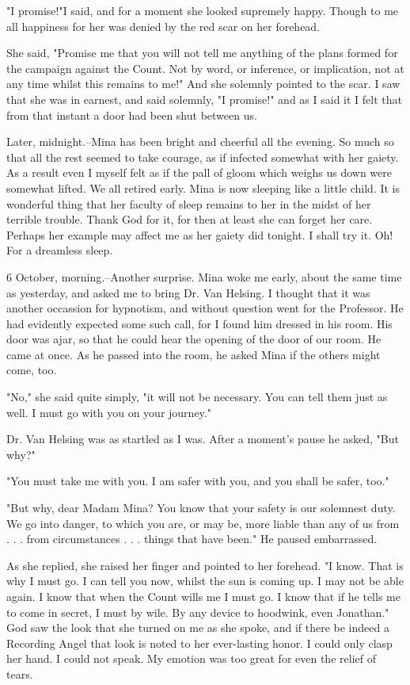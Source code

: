 "I promise!"I said, and for a moment she looked supremely happy. Though to me all happiness for her was denied by the red scar on her forehead. 

She said, "Promise me that you will not tell me anything of the plans formed for the campaign against the Count. Not by word, or inference, or implication, not at any time whilst this remains to me!" And she solemnly pointed to the scar. I saw that she was in earnest, and said solemnly, "I promise!" and as I said it I felt that from that instant a door had been shut between us. 

Later, midnight.--Mina has been bright and cheerful all the evening. So much so that all the rest seemed to take courage, as if infected somewhat with her gaiety. As a result even I myself felt as if the pall of gloom which weighs us down were somewhat lifted. We all retired early. Mina is now sleeping like a little child. It is wonderful thing that her faculty of sleep remains to her in the midst of her terrible trouble. Thank God for it, for then at least she can forget her care. Perhaps her example may affect me as her gaiety did tonight. I shall try it. Oh! For a dreamless sleep. 

6 October, morning.--Another surprise. Mina woke me early, about the same time as yesterday, and asked me to bring Dr. Van Helsing. I thought that it was another occassion for hypnotism, and without question went for the Professor. He had evidently expected some such call, for I found him dressed in his room. His door was ajar, so that he could hear the opening of the door of our room. He came at once. As he passed into the room, he asked Mina if the others might come, too. 

"No," she said quite simply, "it will not be necessary. You can tell them just as well. I must go with you on your journey." 

Dr. Van Helsing was as startled as I was. After a moment's pause he asked, "But why?" 

"You must take me with you. I am safer with you, and you shall be safer, too." 

"But why, dear Madam Mina? You know that your safety is our solemnest duty. We go into danger, to which you are, or may be, more liable than any of us from . . . from circumstances . . . things that have been." He paused embarrassed. 

As she replied, she raised her finger and pointed to her forehead. "I know. That is why I must go. I can tell you now, whilst the sun is coming up. I may not be able again. I know that when the Count wills me I must go. I know that if he tells me to come in secret, I must by wile. By any device to hoodwink, even Jonathan." God saw the look that she turned on me as she spoke, and if there be indeed a Recording Angel that look is noted to her ever-lasting honor. I could only clasp her hand. I could not speak. My emotion was too great for even the relief of tears. 

